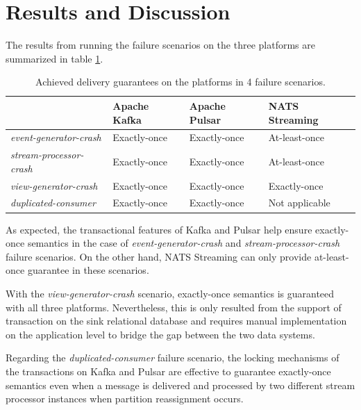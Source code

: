 \section{Results and Discussion}
The results from running the failure scenarios on the three platforms are summarized in table \ref{fig:failurescenariosresult}.
\begin{table}[h]
	\centering
	\begin{tabular}{|l|l|l|l|}
		\hline
		& Apache Kafka & Apache Pulsar & NATS Streaming \\ \hline
		\textit{event-generator-crash}  & Exactly-once & Exactly-once  & At-least-once  \\ \hline
		\textit{stream-processor-crash} & Exactly-once & Exactly-once  & At-least-once  \\ \hline
		\textit{view-generator-crash}   & Exactly-once & Exactly-once  & Exactly-once   \\ \hline
		\textit{duplicated-consumer}    & Exactly-once & Exactly-once  & Not applicable \\ \hline
	\end{tabular}
	\caption{Achieved delivery guarantees on the platforms in 4 failure scenarios.}
	\label{fig:failurescenariosresult}
\end{table}

As expected, the transactional features of Kafka and Pulsar help ensure exactly-once semantics in the case of \emph{event-generator-crash} and \emph{stream-processor-crash} failure scenarios. On the other hand, NATS Streaming can only provide at-least-once guarantee in these scenarios.  

With the \emph{view-generator-crash} scenario, exactly-once semantics is guaranteed with all three platforms. Nevertheless, this is only resulted from the support of transaction on the sink relational database and requires manual implementation on the application level to bridge the gap between the two data systems. 

Regarding the \emph{duplicated-consumer} failure scenario, the locking mechanisms of the transactions on Kafka and Pulsar are effective to guarantee exactly-once semantics even when a message is delivered and processed by two different stream processor instances when partition reassignment occurs. 

